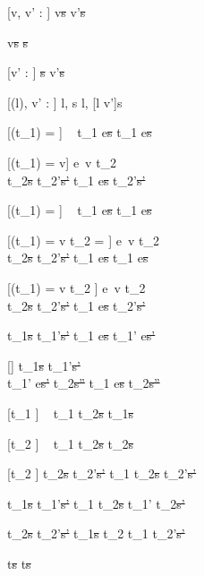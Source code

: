 [v, v' : \tau]
  { }
  {\Edit v\st{s}  \Edit v'\st{s}}

  { }
  {\Edit v\st{s} \handle{\Empty} \Fill\st{s}}

[v' : \tau]
  { }
  {\Fill \tau\st{s}  \Edit v'\st{s}}

[\Sigma(l), v' : \tau]
  { }
  {\Watch l, s  \Watch l, [l \mapsto v']s}

[\Value(t_1) = \nothing]
  {\ }
  {t_1 \Next e\st{s} \handle{\Continue} t_1 \Next e\st{s}}

[\Value(t_1) = v]
  {e\ v \downto t_2    \\
   t_2\st{s} \normalise t_2'\st{s'} }
  {t_1 \Next e\st{s} \handle{\Continue} t_2'\st{s'}}

[\Value(t_1) = \nothing]
  {\ }
  {t_1 \Then e\st{s} \handle{\Execute \pi} t_1 \Then e\st{s}}

[\Value(t_1) = v \land t_2 = \Fail]
  {e\ v \downto t_2    \\
   t_2\st{s} \handle{\Pick \pi} t_2'\st{s'} }
  {t_1 \Then e\st{s} \handle{\Execute \pi} t_1 \Then e\st{s}}

[\Value(t_1) = v \land t_2 \neq \Fail]
  {e\ v \downto t_2    \\
   t_2\st{s} \handle{\Pick \pi} t_2'\st{s'} }
  {t_1 \Then e\st{s} \handle{\Execute \pi} t_2'\st{s'}}

  {t_1\st{s} \handle{\eta} t_1'\st{s'}}
  {t_1 \Next e\st{s} \handle{\eta} t_1' \Next e\st{s'}}

[\eta \neq \Execute \pi]
  {t_1\st{s} \handle{\eta} t_1'\st{s'}       \\
   t_1' \Then e\st{s'} \normalise t_2\st{s''} }
  {t_1 \Then e\st{s} \handle{\eta} t_2\st{s''}}

[t_1 \neq \Fail]
  {\ }
  {t_1 \Or t_2\st{s} \handle{\Pick \First} t_1\st{s}}

[t_2 \neq \Fail]
  {\ }
  {t_1 \Or t_2\st{s} \handle{\Pick \Second} t_2\st{s}}

[t_2 \neq \Fail]
  {t_2\st{s} \handle{\Pick \pi} t_2'\st{s'}}
  {t_1 \Or t_2\st{s} \handle{\Pick \Other \pi} t_2'\st{s'}}


  {t_1\st{s} \handle{\eta} t_1'\st{s'} }
  {t_1 \AndOr t_2\st{s} \handle{\Left \eta} t_1' \AndOr t_2\st{s'}}

  {t_2\st{s} \handle{\eta} t_2'\st{s'} }
  {t_1\st{s} \AndOr t_2 \handle{\Right \eta} t_1 \AndOr t_2'\st{s'}}

  { }
  {t\st{s} \handle{\eta} t\st{s}}
